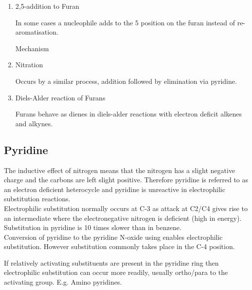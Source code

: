 \begin{enumerate}[label=\alph*)]
  \item 2,5-addition to Furan


    In some cases a nucleophile adds to the 5 position on the furan instead of re-aromatisation.


    Mechanism


  \item Nitration

    Occurs by a similar process, addition followed by elimination via pyridine.


  \item Diels-Alder reaction of Furans

    Furans behave as dienes in diels-alder reactions with electron deficit alkenes
    and alkynes.


\end{enumerate}

\subsection{Pyridine}

The inductive effect of nitrogen means that the nitrogen has a slight negative charge and the carbons are left slight positive.
Therefore pyridine is referred to as an electron deficient heterocycle and pyridine is unreactive in electrophilic substitution reactions.\\

Electrophilic substitution normally occurs at C-3 as attack at C2/C4 gives rise to an intermediate where the electronegative nitrogen is deficient (high in energy).
Substitution in pyridine is 10 times slower than in benzene.\\

Conversion of pyridine to the pyridine N-oxide using  enables electrophilic substitution.
However substitution commonly takes place in the C-4 position.


If relatively activating substituents are present in the pyridine ring then electrophilic substitution can occur more readily, usually ortho/para to the activating group. E.g. Amino pyridines.

